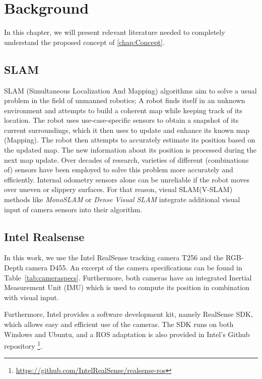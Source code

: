 \documentclass[main.tex]{subfiles}
\begin{document}
\chapter{Background}\label{chap:Background}
In this chapter, we will present relevant literature needed to completely understand the proposed concept of \autoref{chap:Concept}.

\section{SLAM}
SLAM (Simultaneous Localization And Mapping) algorithms aim to solve a usual problem in the field of unmanned robotics;
A robot finds itself in an unknown environment and attempts to build a coherent map while keeping track of its location.
The robot uses use-case-specific sensors to obtain a snapshot of its current surroundings, which it then uses to update and enhance its known map (Mapping).
The robot then attempts to accurately estimate its position based on the updated map. The new information about its position is processed during the next map update.
Over decades of research, varieties of different (combinations of) sensors have been employed to solve this problem more accurately and efficiently.
Internal odometry sensors alone can be unreliable if the robot moves over uneven or slippery surfaces. For that reason, visual SLAM(V-SLAM) methods like \textit{MonoSLAM}\cite{1238654} or 
\textit{Dense Visual SLAM}\cite{Kerl_Sturm_Cremers_2013} integrate additional visual input of camera sensors into their algorithm. 


\section{Intel Realsense}
In this work, we use the Intel RealSense tracking camera T256 and the RGB-Depth camera D455. An excerpt of the camera 
specifications can be found in Table~\ref{tab:cameraspecs}.
Furthermore, both cameras have an integrated Inertial Measurement Unit (IMU) which is used to compute its position in combination with visual input.

Furthermore, Intel provides a software development kit, namely RealSense SDK, which allows easy and efficient use of the cameras.
The SDK runs on both Windows and Ubuntu, and a ROS adaptation is also provided in Intel's Github repository \footnote{\href{https://github.com/IntelRealSense/realsense-ros}{https://github.com/IntelRealSense/realsense-ros}}. 
\end{document}
